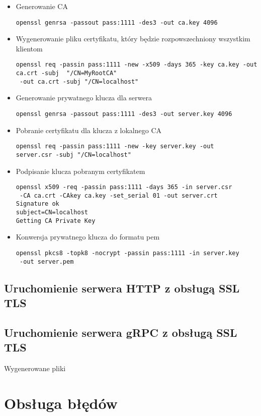 \begin{itemize}
    \item Generowanie CA
          \begin{lstlisting}
openssl genrsa -passout pass:1111 -des3 -out ca.key 4096
\end{lstlisting}
    \item Wygenerowanie pliku certyfikatu, który będzie rozpowszechniony wszystkim klientom
\begin{lstlisting}
openssl req -passin pass:1111 -new -x509 -days 365 -key ca.key -out ca.crt -subj  "/CN=MyRootCA"
 -out ca.crt -subj "/CN=localhost"
\end{lstlisting}
    \item Generowanie prywatnego klucza dla serwera
          \begin{lstlisting}
openssl genrsa -passout pass:1111 -des3 -out server.key 4096
\end{lstlisting}
    \item Pobranie certyfikatu dla klucza z lokalnego CA
          \begin{lstlisting}
openssl req -passin pass:1111 -new -key server.key -out
server.csr -subj "/CN=localhost"
\end{lstlisting}
    \item Podpisanie klucza pobranym certyfikatem
          \begin{lstlisting}
openssl x509 -req -passin pass:1111 -days 365 -in server.csr
 -CA ca.crt -CAkey ca.key -set_serial 01 -out server.crt
Signature ok
subject=CN=localhost
Getting CA Private Key
\end{lstlisting}
    \item Konwersja prywatnego klucza do formatu pem
          \begin{lstlisting}
openssl pkcs8 -topk8 -nocrypt -passin pass:1111 -in server.key
 -out server.pem
\end{lstlisting}
\end{itemize}
\subsection{Uruchomienie serwera HTTP z obsługą SSL\\TLS}
\subsection{Uruchomienie serwera gRPC z obsługą SSL\\TLS}
\par Wygenerowane pliki
\section{Obsługa błędów}
